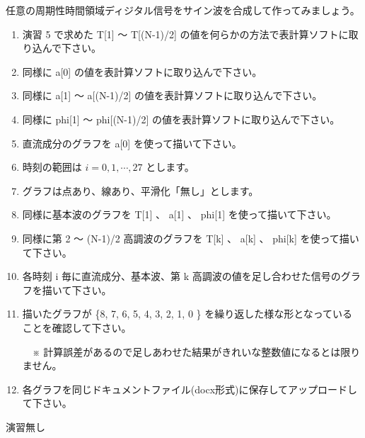 \documentclass[a4paper]{jarticle}
\begin{document}
 任意の周期性時間領域ディジタル信号をサイン波を合成して作ってみましょう。\par
\vspace{1zh}
\begin{enumerate}
\item 演習 5 で求めた T[1] 〜 T[(N-1)/2] の値を何らかの方法で表計算ソフトに取り込んで下さい。
\item 同様に a[0] の値を表計算ソフトに取り込んで下さい。
\item 同様に a[1] 〜 a[(N-1)/2] の値を表計算ソフトに取り込んで下さい。
\item 同様に phi[1] 〜 phi[(N-1)/2] の値を表計算ソフトに取り込んで下さい。
\item 直流成分のグラフを a[0] を使って描いて下さい。
\item 時刻の範囲は $i = 0, 1,  \cdots, 27$ とします。
\item グラフは点あり、線あり、平滑化「無し」とします。
\item 同様に基本波のグラフを T[1] 、 a[1] 、 phi[1] を使って描いて下さい。
\item 同様に第 2 〜 (N-1)/2 高調波のグラフを T[k] 、 a[k] 、 phi[k] を使って描いて下さい。
\item 各時刻 i 毎に直流成分、基本波、第 k 高調波の値を足し合わせた信号のグラフを描いて下さい。
\item 描いたグラフが \{8, 7, 6, 5, 4, 3, 2, 1, 0 \} を繰り返した様な形となっていることを確認して下さい。\par
　※ 計算誤差があるので足しあわせた結果がきれいな整数値になるとは限りません。
\item 各グラフを同じドキュメントファイル(docx形式)に保存してアップロードして下さい。
\end{enumerate}


\vspace{2zh}
\noindent 演習無し


\savepractime
\end{document}
